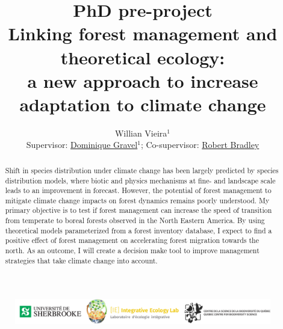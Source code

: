 


\title{
  PhD pre-project \\
  \bigskip
  Linking forest management and theoretical ecology: \\
  a new approach to increase adaptation to climate change
}

\author{Willian Vieira$^1$\\{\small Supervisor: \href{http://ielab.recherche.usherbrooke.ca}{Dominique Gravel}$^1$; Co-supervisor: \href{https://www.usherbrooke.ca/biologie/personnel/professeurs/ecologie-terrestre/robert-bradley/}{Robert Bradley}}}
\date{}



\maketitle

\begin{abstract}
Shift in species distribution under climate change has been largely predicted by species distribution models, where biotic and physics mechanisms at fine- and landscape scale leads to an improvement in forecast.
However, the potential of forest management to mitigate climate change impacts on forest dynamics remains poorly understood.
My primary objective is to test if forest management can increase the speed of transition from temperate to boreal forests observed in the North Eastern America.
By using theoretical models parameterized from a forest inventory database, I expect to find a positive effect of forest management on accelerating forest migration towards the north.
As an outcome, I will create a decision make tool to improve management strategies that take climate change into account.
\end{abstract}


\tableofcontents

\vfill
\begin{figure}
\centering\includegraphics[width=16cm]{img/logo.pdf}
\end{figure}
\thispagestyle{empty} %
\clearpage

